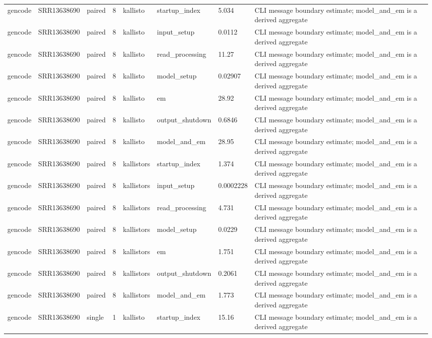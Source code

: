 \begin{tabular}{llllllll}
gencode & SRR13638690 & paired & 8 & kallisto & startup\_index & 5.034 & CLI message boundary estimate; model\_and\_em is a derived aggregate \\
gencode & SRR13638690 & paired & 8 & kallisto & input\_setup & 0.0112 & CLI message boundary estimate; model\_and\_em is a derived aggregate \\
gencode & SRR13638690 & paired & 8 & kallisto & read\_processing & 11.27 & CLI message boundary estimate; model\_and\_em is a derived aggregate \\
gencode & SRR13638690 & paired & 8 & kallisto & model\_setup & 0.02907 & CLI message boundary estimate; model\_and\_em is a derived aggregate \\
gencode & SRR13638690 & paired & 8 & kallisto & em & 28.92 & CLI message boundary estimate; model\_and\_em is a derived aggregate \\
gencode & SRR13638690 & paired & 8 & kallisto & output\_shutdown & 0.6846 & CLI message boundary estimate; model\_and\_em is a derived aggregate \\
gencode & SRR13638690 & paired & 8 & kallisto & model\_and\_em & 28.95 & CLI message boundary estimate; model\_and\_em is a derived aggregate \\
gencode & SRR13638690 & paired & 8 & kallistors & startup\_index & 1.374 & CLI message boundary estimate; model\_and\_em is a derived aggregate \\
gencode & SRR13638690 & paired & 8 & kallistors & input\_setup & 0.0002228 & CLI message boundary estimate; model\_and\_em is a derived aggregate \\
gencode & SRR13638690 & paired & 8 & kallistors & read\_processing & 4.731 & CLI message boundary estimate; model\_and\_em is a derived aggregate \\
gencode & SRR13638690 & paired & 8 & kallistors & model\_setup & 0.0229 & CLI message boundary estimate; model\_and\_em is a derived aggregate \\
gencode & SRR13638690 & paired & 8 & kallistors & em & 1.751 & CLI message boundary estimate; model\_and\_em is a derived aggregate \\
gencode & SRR13638690 & paired & 8 & kallistors & output\_shutdown & 0.2061 & CLI message boundary estimate; model\_and\_em is a derived aggregate \\
gencode & SRR13638690 & paired & 8 & kallistors & model\_and\_em & 1.773 & CLI message boundary estimate; model\_and\_em is a derived aggregate \\
gencode & SRR13638690 & single & 1 & kallisto & startup\_index & 15.16 & CLI message boundary estimate; model\_and\_em is a derived aggregate \\

\end{tabular}
